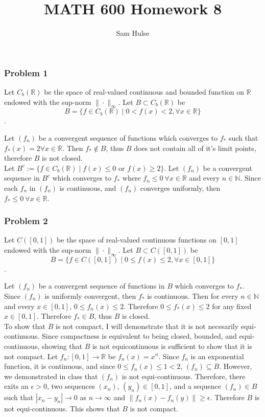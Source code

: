\documentclass{article}
\title{MATH 600 Homework 8}
\author{Sam Hulse}
\newcommand{\N}{\mathbb{N}}
\newcommand{\R}{\mathbb{R}}
\begin{document}
\maketitle

\subsubsection*{Problem 1}
Let $C_b(\R)$ be the space of real-valued continuous and bounded function on $\R$ endowed with the sup-norm $\|\cdot\|_\infty$. Let $B \subset C_b(\R)$ be \\

$$B = \{f \in C_b(\R) \mid 0 < f(x) < 2, \forall x \in \R \}$$.
 
Let $(f_n)$ be a convergent sequence of functions which converges to $f_*$ such that $f_*(x) = 2 \forall x \in \R$. Then $f_* \not \in B$, thus $B$ does not contain all of it's limit points, therefore $B$ is not closed.\\

Let $B^c := \{f \in C_b(\R) \mid f(x) \leq 0$ or $f(x) \geq 2\}$. Let $(f_n)$ be a convergent sequence in $B^c$ which converges to $f_*$ where $f_n \leq 0 \ \forall x \in \R
$ and every $n \in \N$. Since each $f_n$ in $(f_n)$ is continuous, and $(f_n)$ converges uniformly, then $f_* \leq 0 \ \forall x \in \R$. 

\subsubsection*{Problem 2}
Let $C([0, 1])$ be the space of real-valued continuous functions on $[0, 1]$ endowed with the sup-norm $\|\cdot\|_\infty$. Let $B \subset C([0, 1])$ be \\

$$B = \{f \in C([0, 1]) \mid 0 \leq f(x) \leq 2, \forall x \in [0, 1]\}$$.

Let $(f_n)$ be a convergent sequence of functions in $B$ which converges to $f_*$. Since $(f_n)$ is uniformly convergent, then $f_*$ is continuous. Then for every $n \in \N$ and every $x \in [0, 1]$, $0 \leq f_n(x) \leq 2$. Therefore $0 \leq f_*(x) \leq 2$ for any fixed $x \in [0, 1]$. Therefore $f_* \in B$, thus $B$ is closed.\\

To show that $B$ is not compact, I will demonstrate that it is not necesarily equi-continuous. Since compactness is equivalent to being closed, bounded, and equi-continuous, showing that $B$ is not equicontinuous is sufficient to show that it is not compact. Let $f_n : [0, 1] \rightarrow \R$ be $f_n(x) = x^n$. Since $f_n$ is an exponential function, it is continuous, and since $0 \leq f_n(x) \leq 1 < 2$, $(f_n) \subseteq B$. However, we demonstrated in class that $(f_n)$ is not equi-continuous. Therefore, there exits an $\epsilon > 0$, two sequences $(x_n)$, $(y_n) \in [0, 1]$, and a sequence $(f_n) \in B$ such that $|x_n - y_n| \rightarrow 0$ as $n \rightarrow \infty$ and $\|f_n(x) - f_n(y)\| \geq \epsilon$. Therefore $B$ is not equi-continuous. This shows that $B$ is not compact.
\end{document}
